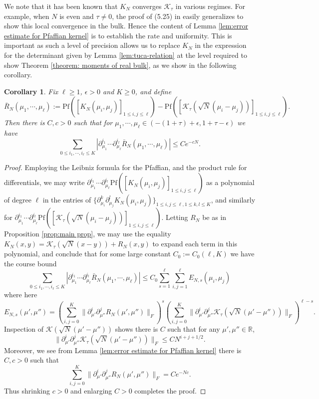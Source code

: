 \documentclass[12pt]{article}
\newcommand{\R}{\mathbb{R}}
\newtheorem{corr}[info]{Corollary}
\numberwithin{info}{section}
\numberwithin{equation}{section}
\renewcommand{\[}{\begin{equation}}
\renewcommand{\]}{\end{equation}}
\renewcommand{\cal}{\mathcal}
\newcommand{\<}{\langle}
\renewcommand{\>}{\rangle}
\newcommand{\pf}{\mathrm{Pf}}
\renewcommand{\l}{\left}
\renewcommand{\r}{\right}
\begin{document}
	We note that it has been known that $K_N$ converges $\cal{K}_{\tau}$ in various regimes. For example, when $N$ is even and $\tau \neq 0$, the proof of (5.25) in \cite{forrester-elliptic} easily generalizes to show this local convergence in the bulk. Hence the content of Lemma \ref{lem:error estimate for Pfaffian kernel} is to establish the rate and uniformity. This is important as such a level of precision allows us to replace $K_N$ in the expression for the determinant given by Lemma \ref{lem:tuca-relation} at the level required to show Theorem \ref{theorem: moments of real bulk}, as we show in the following corollary.
	
	\begin{corr}
		\label{corr:error estimate for pfaffian}
		Fix $\ell\ge 1$, $\epsilon>0$ and $K\ge 0$, and define
		\[\bar{R}_N(\mu_1,\cdots,\mu_\ell):=\pf(\l[K_{N}\l(\mu_i,\mu_j\r)\r]_{1\le i,j\le \ell})-\pf\l(\l[\cal{K}_{\tau}\left(\sqrt{N}\l(\mu_i-\mu_j\r)\right)\r]_{1\le i,j\le \ell}\r).\]
		Then there is $C,c>0$ such that for $\mu_1,\cdots,\mu_\ell\in (-(1+\tau)+\epsilon,1+\tau-\epsilon)$ we have
		\[\sum_{0\le i_1,\cdots,i_\ell\le K}|\partial_{\mu_1}^{i_1}\cdots \partial_{\mu_\ell}^{i_l}\bar{R}_N(\mu_1,\cdots,\mu_\ell)|\le Ce^{-cN}.\]
	\end{corr}
	\begin{proof}
		Employing the Leibniz formula for the Pfaffian, and the product rule for differentials, we may write $\partial_{\mu_1}^{i_1}\cdots \partial_{\mu_\ell}^{i_l}\pf([K_N(\mu_i,\mu_j)]_{1\le i,j\le \ell})$ as a polynomial of degree $\ell$ in the entries of $\{\partial_{\mu_i}^{k}\partial_{\mu_j}^{l}K_N(\mu_i,\mu_j)\}_{1\le i,j\le \ell, 1\le k,l\le K}$, and similarly for $\partial_{\mu_1}^{i_1}\cdots \partial_{\mu_\ell}^{i_l}\pf([\cal{K}_{\tau}(\sqrt{N}(\mu_i-\mu_j))]_{1\le i,j\le \ell})$. Letting $R_N$ be as in Proposition \ref{prop:main prop}, we may use the equality $K_N(x,y)=\cal{K}_{\tau}(\sqrt{N}(x-y))+R_N(x,y)$ to expand each term in this polynomial, and conclude that for some large constant $C_0:=C_0(\ell,K)$ we have the course bound
		\[\sum_{0\le i_1,\cdots,i_\ell\le K}\left|\partial_{\mu_1}^{i_1}\cdots \partial_{\mu_\ell}^{i_l}\bar{R}_N(\mu_1,\cdots,\mu_\ell)\right|\le C_0\sum_{s=1}^{\ell}\sum_{i,j=1}^{\ell}E_{N,s}(\mu_i,\mu_j)\]
		where here
		\[E_{N,s}(\mu',\mu'')=\left(\sum_{i,j=0}^{K}\|\partial_{\mu'}^i\partial_{\mu''}^jR_N(\mu',\mu'')\|_F\right)^{s}\left(\sum_{i,j=0}^{K}\|\partial_{\mu'}^i\partial_{\mu''}^j\cal{K}_{\tau}(\sqrt{N}(\mu'-\mu''))\|_F\right)^{\ell-s}.\]
		Inspection of $\cal{K}(\sqrt{N}(\mu'-\mu''))$ shows there is $C$ such that for any $\mu',\mu''\in \R$,
		\[\|\partial_{\mu'}^i\partial_{\mu''}^j\cal{K}_{\tau}(\sqrt{N}(\mu'-\mu''))\|_F\le C N^{i+j+1/2}.\]
		Moreover, we see from Lemma \ref{lem:error estimate for Pfaffian kernel} there is $C,c>0$ such that
		\[\sum_{i,j=0}^{K}\|\partial_{\mu'}^i\partial_{\mu''}^jR_N(\mu',\mu'')\|_F=Ce^{-Nc}.\]
		Thus shrinking $c>0$ and enlarging $C>0$ completes the proof.
	\end{proof}
	
\end{document}
